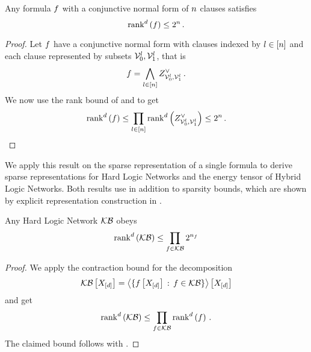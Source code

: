 \begin{theorem}
    \label{the:formulaSlicePolynomialDecomposition}
    Any formula $f$ with a conjunctive normal form of $n$ clauses satisfies
    \[ \mathrm{rank}^{d}\left(f\right) \leq 2^{n} \, . \]
\end{theorem}
\begin{proof}
    Let $f$ have a conjunctive normal form with clauses indexed by $l\in[n]$ and each clause represented by subsets $\mathcal{V}_0^l, \mathcal{V}_1^l$, that is
    \[ f = \bigwedge_{l\in[n]} Z^{\lor}_{\mathcal{V}_0^l,\mathcal{V}_1^l} \, . \]
    We now use the rank bound of  and  to get
    \begin{align*}
        \mathrm{rank}^{d}\left(f\right) \leq \prod_{l\in[n]} \mathrm{rank}^{d}\left(Z^{\lor}_{\mathcal{V}_0^l,\mathcal{V}_1^l}\right) \leq 2^{n} \, .
    \end{align*}
\end{proof}

We apply this result on the sparse representation of a single formula to derive sparse representations for Hard Logic Networks and the energy tensor of Hybrid Logic Networks.
Both results use in addition to  sparsity bounds, which are shown by explicit representation construction in .

\begin{corollary}
    Any Hard Logic Network $\mathcal{KB}$ obeys
    \begin{align*}
        \mathrm{rank}^{d}\left(\mathcal{KB}\right) \leq \prod_{f\in\mathcal{KB}} 2^{n_{f}}
    \end{align*}
\end{corollary}
\begin{proof}
    We apply the contraction bound  for the decomposition
    \begin{align*}
        \mathcal{KB}\left[X_{[d]}\right] = \left\langle \{f\left[X_{[d]}\right] \, : \, f\in\mathcal{KB}\}\right\rangle \left[ X_{[d]} \right]
    \end{align*}
    and get
    \begin{align*}
        \mathrm{rank}^{d}\left(\mathcal{KB}\right) \leq \prod_{f\in\mathcal{KB}} \mathrm{rank}^{d}\left(f\right) \, .
    \end{align*}
    The claimed bound follows with .
\end{proof}

